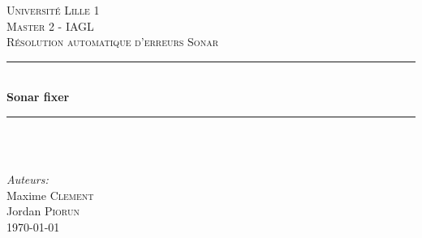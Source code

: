 \documentclass[a4paper]{article}
\begin{document}
\begin{titlepage}
	
	\newcommand{\HRule}{\rule{\linewidth}{0.5mm}} %
	
	\center %
	
	
	\textsc{\LARGE Université Lille 1}\\[1.5cm] %
	\textsc{\Large Master 2 - IAGL}\\[0.5cm] %
	\textsc{\large Résolution automatique d'erreurs Sonar}\\[0.5cm] %
	
	\HRule \\[0.4cm]
	{ \huge \bfseries Sonar fixer}\\[0.4cm] %
	\HRule \\[1.5cm]
	
	~
	
	\Large \emph{Auteurs:}\\
	Maxime \textsc{Clement}\\ %
	Jordan \textsc{Piorun}\\[3cm]
	
	{\large \today}\\[3cm] %
	
	\vfill %
	
\end{titlepage}

\vfill %
\clearpage

\newpage
\tableofcontents
\newpage
\end{document}
